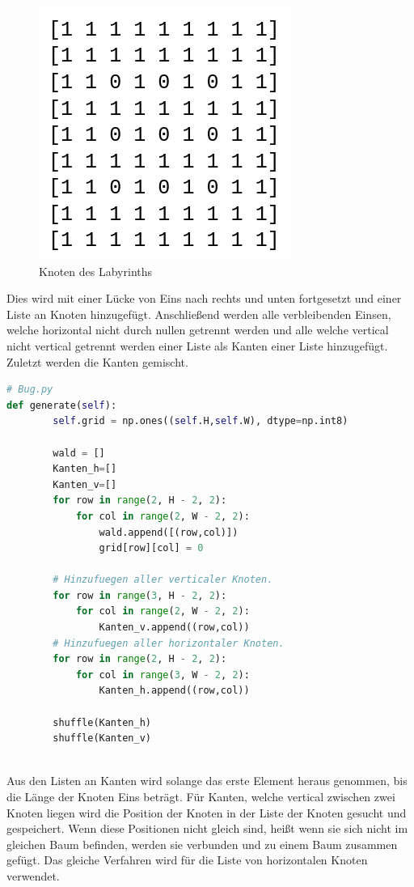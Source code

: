 \documentclass[12pt, a4paper, titlepage]{article}
\begin{document}
\begin{figure}[h]
	\centering
	\includegraphics[scale=.5]{textlab0.png}
	\caption{Knoten des Labyrinths}
	\label{fig: textlab0}
\end{figure}

Dies wird mit einer Lücke von Eins nach rechts und unten fortgesetzt und einer Liste an Knoten hinzugefügt.
Anschließend werden alle verbleibenden Einsen, welche horizontal nicht durch nullen getrennt werden und alle welche vertical nicht vertical getrennt werden einer Liste als Kanten einer Liste hinzugefügt.
Zuletzt werden die Kanten gemischt.

\begin{lstlisting}[language = Python]
# Bug.py
def generate(self):
        self.grid = np.ones((self.H,self.W), dtype=np.int8)

		wald = []
		Kanten_h=[]
		Kanten_v=[]
		for row in range(2, H - 2, 2):
		    for col in range(2, W - 2, 2):
		        wald.append([(row,col)])
		        grid[row][col] = 0
		
		# Hinzufuegen aller verticaler Knoten.
		for row in range(3, H - 2, 2):          
		    for col in range(2, W - 2, 2):
		        Kanten_v.append((row,col))
		# Hinzufuegen aller horizontaler Knoten.
		for row in range(2, H - 2, 2):
		    for col in range(3, W - 2, 2):
		        Kanten_h.append((row,col))
		
		shuffle(Kanten_h)
		shuffle(Kanten_v)
        
\end{lstlisting}



Aus den Listen an Kanten wird solange das erste Element heraus genommen, bis die Länge der Knoten Eins beträgt.
Für Kanten, welche vertical zwischen zwei Knoten liegen wird die Position der Knoten in der Liste der Knoten gesucht und gespeichert.
Wenn diese Positionen nicht gleich sind, heißt wenn sie sich nicht im gleichen Baum befinden, werden sie verbunden und zu einem Baum zusammen gefügt.
Das gleiche Verfahren wird für die Liste von horizontalen Knoten verwendet.
\end{document}
